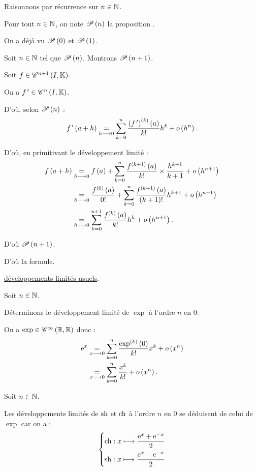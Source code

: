\begin{dem}
Raisonnons par récurrence sur \(n\in\N\).

Pour tout \(n\in\N\), on note \(\P{n}\) la proposition .

On a déjà vu \(\P{0}\) et \(\P{1}\).

Soit \(n\in\N\) tel que \(\P{n}\). Montrons \(\P{n+1}\).

Soit \(f\in\ensclasse{n+1}{I}{\K}\).

On a \(f\prim\in\ensclasse{n}{I}{\K}\).

D'où, selon \(\P{n}\) : \[f\prim\paren{a+h}\egqd{h\to0}\sum_{k=0}^n\dfrac{\paren{f\prim}\deriv{k}\paren{a}}{k!}h^k+\o{h^n}.\]

D'où, en primitivant le développement limité : \[\begin{aligned}
f\paren{a+h}&\egqd{h\to0}f\paren{a}+\sum_{k=0}^n\dfrac{f\deriv{k+1}\paren{a}}{k!}\times\dfrac{h^{k+1}}{k+1}+\o{h^{n+1}} \\
&\egqd{h\to0}\dfrac{f\deriv{0}\paren{a}}{0!}+\sum_{k=0}^n\dfrac{f\deriv{k+1}\paren{a}}{\paren{k+1}!}h^{k+1}+\o{h^{n+1}} \\
&\egqd{h\to0}\sum_{k=0}^{n+1}\dfrac{f\deriv{k}\paren{a}}{k!}h^k+\o{h^{n+1}}.
\end{aligned}\]

D'où \(\P{n+1}\).

D'où la formule.
\end{dem}

\begin{ex}
\Cf \hyperref[subsec:développementsLimitésUsuels]{développements limités usuels}.
\end{ex}

\begin{dem}[\(\exp\)]
Soit \(n\in\N\).

Déterminons le développement limité de \(\exp\) à l'ordre \(n\) en \(0\).

On a \(\exp\in\ensclasse{\infty}{\R}{\R}\) donc : \[\begin{aligned}
\e{x}&\egqd{x\to0}\sum_{k=0}^n\dfrac{\exp\deriv{k}\paren{0}}{k!}x^k+\o{x^n} \\
&\egqd{x\to0}\sum_{k=0}^n\dfrac{x^k}{k!}+\o{x^n}.
\end{aligned}\]
\end{dem}

\begin{dem}[\(\sh\) \& \(\ch\)]
Soit \(n\in\N\).

Les développements limités de \(\sh\) et \(\ch\) à l'ordre \(n\) en \(0\) se déduisent de celui de \(\exp\) car on a : \[\begin{dcases}
\ch:x\mapsto\dfrac{\e{x}+\e{-x}}{2} \\
\sh:x\mapsto\dfrac{\e{x}-\e{-x}}{2}
\end{dcases}\]
\end{dem}

